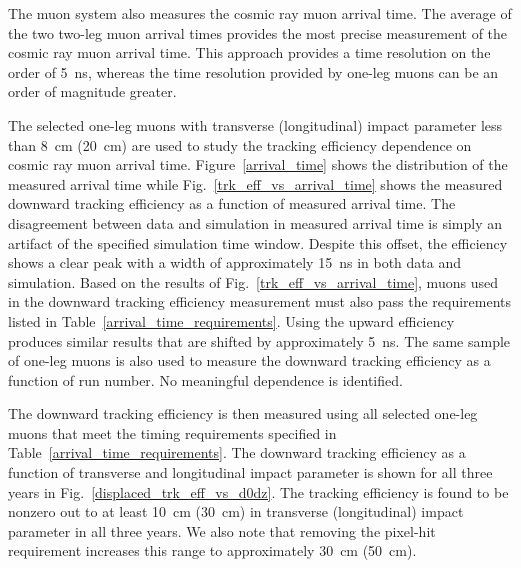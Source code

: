 The muon system also measures the cosmic ray muon arrival time. The average of the two two-leg muon arrival times provides the most precise measurement of the cosmic ray muon arrival time. This approach provides a time resolution on the order of \SI{5}{\ns}, whereas the time resolution provided by one-leg muons can be an order of magnitude greater.

The selected one-leg muons with transverse (longitudinal) impact parameter less than \SI{8}{\cm} (\SI{20}{\cm}) are used to study the tracking efficiency dependence on cosmic ray muon arrival time. Figure~\ref{arrival_time} shows the distribution of the measured arrival time while Fig.~\ref{trk_eff_vs_arrival_time} shows the measured downward tracking efficiency as a function of measured arrival time. The disagreement between data and simulation in measured arrival time is simply an artifact of the specified simulation time window. Despite this offset, the efficiency shows a clear peak with a width of approximately \SI{15}{\ns} in both data and simulation. Based on the results of Fig.~\ref{trk_eff_vs_arrival_time}, muons used in the downward tracking efficiency measurement must also pass the requirements listed in Table~\ref{arrival_time_requirements}. Using the upward efficiency produces similar results that are shifted by approximately \SI{5}{\ns}. The same sample of one-leg muons is also used to measure the downward tracking efficiency as a function of run number. No meaningful dependence is identified.




The downward tracking efficiency is then measured using all selected one-leg muons that meet the timing requirements specified in Table~\ref{arrival_time_requirements}. The downward tracking efficiency as a function of transverse and longitudinal impact parameter is shown for all three years in Fig.~\ref{displaced_trk_eff_vs_d0dz}. The tracking efficiency is found to be nonzero out to at least \SI{10}{\cm} (\SI{30}{\cm}) in transverse (longitudinal) impact parameter in all three years. We also note that removing the pixel-hit requirement increases this range to approximately \SI{30}{\cm} (\SI{50}{\cm}).



